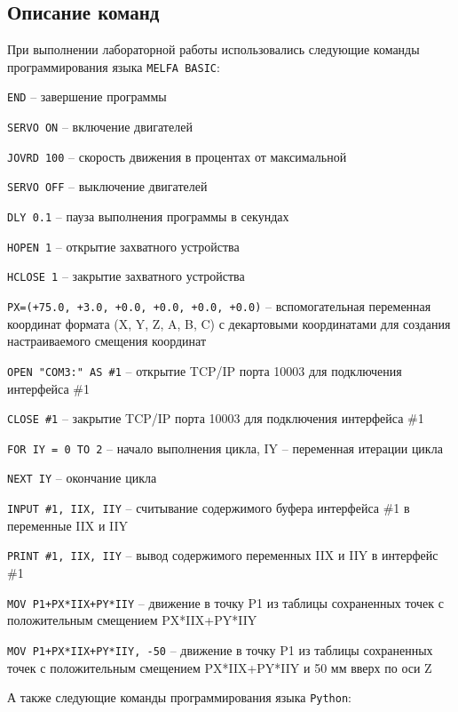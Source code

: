 \documentclass[a4paper, 12pt]{article}
\begin{document}
    \subsection{Описание команд}
    При выполнении лабораторной работы использовались следующие команды программирования языка \texttt{MELFA BASIC}:
    \begin{compactitem}
    \item \texttt{END} -- завершение программы
    \item \texttt{SERVO ON} -- включение двигателей
    \item \texttt{JOVRD 100} -- скорость движения в процентах от максимальной
    \item \texttt{SERVO OFF} -- выключение двигателей
    \item \texttt{DLY 0.1} -- пауза выполнения программы в секундах
    \item \texttt{HOPEN 1} -- открытие захватного устройства
    \item \texttt{HCLOSE 1} -- закрытие захватного устройства 
    \item \texttt{PX=(+75.0, +3.0, +0.0, +0.0, +0.0, +0.0)} -- вспомогательная переменная координат формата (X, Y, Z, A, B, C) с декартовыми координатами для создания настраиваемого смещения координат
    \item \texttt{OPEN "COM3:" AS \#1} -- открытие TCP/IP порта 10003 для подключения интерфейса \#1
    \item \texttt{CLOSE \#1} -- закрытие TCP/IP порта 10003 для подключения интерфейса \#1
    \item \texttt{FOR IY = 0 TO 2} -- начало выполнения цикла, IY -- переменная итерации цикла
    \item \texttt{NEXT IY} -- окончание цикла
    \item \texttt{INPUT \#1, IIX, IIY} -- считывание содержимого буфера интерфейса \#1 в переменные IIX и IIY
    \item \texttt{PRINT \#1, IIX, IIY} -- вывод содержимого переменных IIX и IIY в интерфейс \#1
    \item \texttt{MOV P1+PX*IIX+PY*IIY} -- движение в точку P1 из таблицы сохраненных точек с положительным смещением PX*IIX+PY*IIY
    \item \texttt{MOV P1+PX*IIX+PY*IIY, -50} -- движение в точку P1 из таблицы сохраненных точек с положительным смещением PX*IIX+PY*IIY и 50 мм вверх по оси Z
    \end{compactitem}
    А также следующие команды программирования языка \texttt{Python}:
\end{document}
